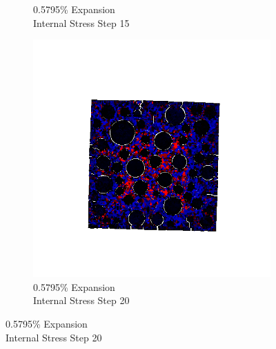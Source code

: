 \begin{figure}[h!]
\begin{subfigure}{.25\textwidth}
      \caption{0.5795\% Expansion\\Internal Stress Step 15}
    \end{subfigure}%
    \begin{subfigure}{.25\textwidth}
      \centering
      \includegraphics[width=1.0\linewidth]{Files/exp_3D/DEF/A30X0C_3_stress.png}
      \caption{0.5795\% Expansion\\Internal Stress Step 20}
    \end{subfigure}


\end{figure}
